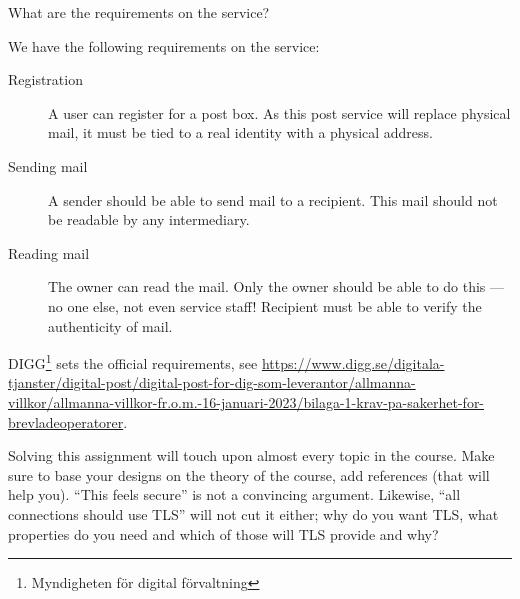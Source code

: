 \begin{frame}
\begin{exercise}
  What are the requirements on the service?
\end{exercise}
\end{frame}

We have the following requirements on the service:
\begin{frame}
\begin{description}
  \item[Registration]
    A user can register for a post box.
    As this post service will replace physical mail, it must be tied to a real 
    identity with a physical address.

    \pause

  \item[Sending mail]
    A sender should be able to send mail to a recipient.
    This mail should not be readable by any intermediary.

  \item[Reading mail]
    The owner can read the mail.
    Only the owner should be able to do this --- no one else, not even service 
    staff!
    Recipient must be able to verify the authenticity of mail.
%
\end{description}
\end{frame}

\begin{frame}
  \begin{remark}
    DIGG\footnote{Myndigheten för digital förvaltning} sets the official 
    requirements, see
    \url{https://www.digg.se/digitala-tjanster/digital-post/digital-post-for-dig-som-leverantor/allmanna-villkor/allmanna-villkor-fr.o.m.-16-januari-2023/bilaga-1-krav-pa-sakerhet-for-brevladeoperatorer}.
  \end{remark}
\end{frame}

Solving this assignment will touch upon almost every topic in the course.
Make sure to base your designs on the theory of the course, add references 
(that will help you).
\enquote{This feels secure} is not a convincing argument.
Likewise, \enquote{all connections should use TLS} will not cut it either; why 
do you want TLS, what properties do you need and which of those will TLS 
provide and why?

